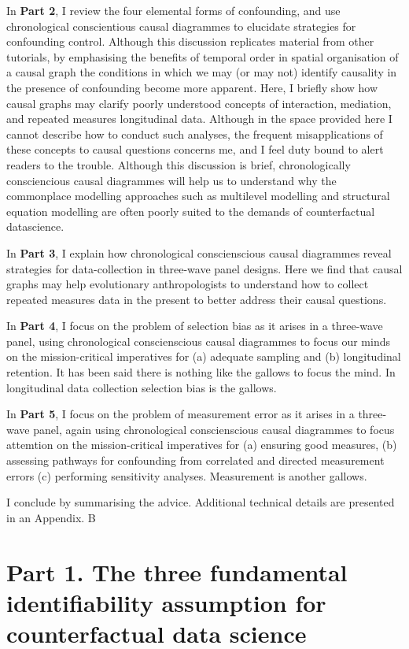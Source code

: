 \documentclass[
  singlecolumn]{report}
\begin{document}
In \textbf{Part 2}, I review the four elemental forms of confounding,
and use chronological conscientious causal diagrammes to elucidate
strategies for confounding control. Although this discussion replicates
material from other tutorials, by emphasising the benefits of temporal
order in spatial organisation of a causal graph the conditions in which
we may (or may not) identify causality in the presence of confounding
become more apparent. Here, I briefly show how causal graphs may clarify
poorly understood concepts of interaction, mediation, and repeated
measures longitudinal data. Although in the space provided here I cannot
describe how to conduct such analyses, the frequent misapplications of
these concepts to causal questions concerns me, and I feel duty bound to
alert readers to the trouble. Although this discussion is brief,
chronologically consciencious causal diagrammes will help us to
understand why the commonplace modelling approaches such as multilevel
modelling and structural equation modelling are often poorly suited to
the demands of counterfactual datascience.

In \textbf{Part 3}, I explain how chronological conscienscious causal
diagrammes reveal strategies for data-collection in three-wave panel
designs. Here we find that causal graphs may help evolutionary
anthropologists to understand how to collect repeated measures data in
the present to better address their causal questions.

In \textbf{Part 4}, I focus on the problem of selection bias as it
arises in a three-wave panel, using chronological conscienscious causal
diagrammes to focus our minds on the mission-critical imperatives for
(a) adequate sampling and (b) longitudinal retention. It has been said
there is nothing like the gallows to focus the mind. In longitudinal
data collection selection bias is the gallows.

In \textbf{Part 5}, I focus on the problem of measurement error as it
arises in a three-wave panel, again using chronological conscienscious
causal diagrammes to focus attemtion on the mission-critical imperatives
for (a) ensuring good measures, (b) assessing pathways for confounding
from correlated and directed measurement errors (c) performing
sensitivity analyses. Measurement is another gallows.

I conclude by summarising the advice. Additional technical details are
presented in an Appendix. B

\hypertarget{part-1.-the-three-fundamental-identifiability-assumption-for-counterfactual-data-science}{%
\section{Part 1. The three fundamental identifiability assumption for
counterfactual data
science}\label{part-1.-the-three-fundamental-identifiability-assumption-for-counterfactual-data-science}}
\end{document}
